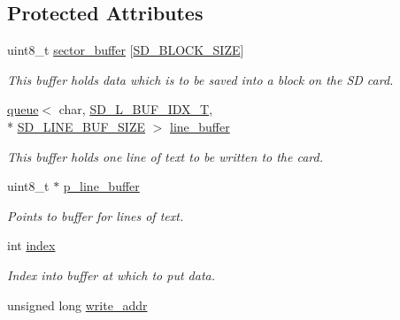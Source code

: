 \subsection*{Protected Attributes}
\begin{DoxyCompactItemize}
\item 
\hypertarget{classsd__card_ac4cc3b5cee55e61d8bd3cf5aca7fd45e}{uint8\-\_\-t \hyperlink{classsd__card_ac4cc3b5cee55e61d8bd3cf5aca7fd45e}{sector\-\_\-buffer} \mbox{[}\hyperlink{sd__card_8h_a451aeffb68f3ecfb82eae03c88e9e48c}{S\-D\-\_\-\-B\-L\-O\-C\-K\-\_\-\-S\-I\-Z\-E}\mbox{]}}\label{classsd__card_ac4cc3b5cee55e61d8bd3cf5aca7fd45e}

\begin{DoxyCompactList}\small\item\em This buffer holds data which is to be saved into a block on the S\-D card. \end{DoxyCompactList}\item 
\hypertarget{classsd__card_af621dab780f50c28cd7408fcf0ada3ec}{\hyperlink{classqueue}{queue}$<$ char, \hyperlink{sd__card_8h_aa25b1f28e3aef588379729587d2155c2}{S\-D\-\_\-\-L\-\_\-\-B\-U\-F\-\_\-\-I\-D\-X\-\_\-\-T}, \\*
\hyperlink{sd__card_8h_a6fd92a542394e4077621133ba8a8254d}{S\-D\-\_\-\-L\-I\-N\-E\-\_\-\-B\-U\-F\-\_\-\-S\-I\-Z\-E} $>$ \hyperlink{classsd__card_af621dab780f50c28cd7408fcf0ada3ec}{line\-\_\-buffer}}\label{classsd__card_af621dab780f50c28cd7408fcf0ada3ec}

\begin{DoxyCompactList}\small\item\em This buffer holds one line of text to be written to the card. \end{DoxyCompactList}\item 
\hypertarget{classsd__card_ac88ab93e401eb88fadf1f37622d87197}{uint8\-\_\-t $\ast$ \hyperlink{classsd__card_ac88ab93e401eb88fadf1f37622d87197}{p\-\_\-line\-\_\-buffer}}\label{classsd__card_ac88ab93e401eb88fadf1f37622d87197}

\begin{DoxyCompactList}\small\item\em Points to buffer for lines of text. \end{DoxyCompactList}\item 
\hypertarget{classsd__card_a7fe8c92ca05cfcbb273962f4479ea802}{int \hyperlink{classsd__card_a7fe8c92ca05cfcbb273962f4479ea802}{index}}\label{classsd__card_a7fe8c92ca05cfcbb273962f4479ea802}

\begin{DoxyCompactList}\small\item\em Index into buffer at which to put data. \end{DoxyCompactList}\item 
\hypertarget{classsd__card_ac9d4ff5187d9c35208e83f886fb3456d}{unsigned long \hyperlink{classsd__card_ac9d4ff5187d9c35208e83f886fb3456d}{write\-\_\-addr}}\label{classsd__card_ac9d4ff5187d9c35208e83f886fb3456d}


\end{DoxyCompactItemize}
